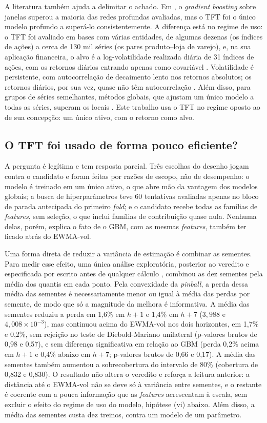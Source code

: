 A literatura também ajuda a delimitar o achado. Em , o \textit{gradient boosting} sobre janelas superou a maioria das redes profundas avaliadas, mas o TFT foi o único modelo profundo a superá-lo consistentemente. A diferença está no regime de uso: o TFT foi avaliado em bases com várias entidades, de algumas dezenas (os índices de ações) a cerca de 130 mil séries (os pares produto--loja de varejo), e, na sua aplicação financeira, o alvo é a log-volatilidade realizada diária de 31 índices de ações, com os retornos diários entrando apenas como covariável \cite{LIMETAL2021TFT}. Volatilidade é persistente, com autocorrelação de decaimento lento nos retornos absolutos; os retornos diários, por sua vez, quase não têm autocorrelação \cite{CONT2001}. Além disso, para grupos de séries semelhantes, métodos globais, que ajustam um único modelo a todas as séries, superam os locais \cite{MONTEROMANSO2021}. Este trabalho usa o TFT no regime oposto ao de sua concepção: um único ativo, com o retorno como alvo.

\subsection{O TFT foi usado de forma pouco eficiente?}
A pergunta é legítima e tem resposta parcial. Três escolhas do desenho jogam contra o candidato e foram feitas por razões de escopo, não de desempenho: o modelo é treinado em um único ativo, o que abre mão da vantagem dos modelos globais; a busca de hiperparâmetros teve 60 tentativas avaliadas apenas no bloco de parada antecipada do primeiro \textit{fold}; e o candidato recebe todas as famílias de \textit{features}, sem seleção, o que inclui famílias de contribuição quase nula. Nenhuma delas, porém, explica o fato de o GBM, com as mesmas \textit{features}, também ter ficado atrás do EWMA-vol.

Uma forma direta de reduzir a variância de estimação é combinar as sementes. Para medir esse efeito, uma única análise exploratória, posterior ao veredito e especificada por escrito antes de qualquer cálculo \cite{WAGENMAKERS2012}, combinou as dez sementes pela média dos quantis em cada ponto. Pela convexidade da \textit{pinball}, a perda dessa média das sementes é necessariamente menor ou igual à média das perdas por semente, de modo que só a magnitude da melhora é informativa. A média das sementes reduziu a perda em 1,6\% em \(h+1\) e 1,4\% em \(h+7\) (\(3{,}988\) e \(4{,}008 \times 10^{-3}\)), mas continuou acima do EWMA-vol nos dois horizontes, em 1,7\% e 0,2\%, sem rejeição no teste de Diebold-Mariano unilateral (p-valores brutos de 0,98 e 0,57), e sem diferença significativa em relação ao GBM (perda 0,2\% acima em \(h+1\) e 0,4\% abaixo em \(h+7\); p-valores brutos de 0,66 e 0,17). A média das sementes também aumentou a sobrecobertura do intervalo de 80\% (cobertura de 0,832 e 0,830). O resultado não altera o veredito e reforça a leitura anterior: a distância até o EWMA-vol não se deve só à variância entre sementes, e o restante é coerente com a pouca informação que as \textit{features} acrescentam à escala, sem excluir o efeito do regime de uso do modelo, hipótese (vi) abaixo. Além disso, a média das sementes custa dez treinos, contra um modelo de um parâmetro.

